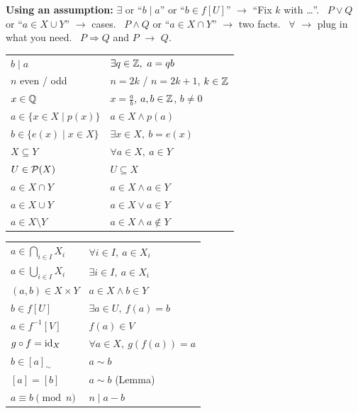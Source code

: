 \textbf{Using an assumption:} $\exists$ or ``$b\mid a$'' or ``$b\in f[U]$'' $\to$ ``Fix $k$ with \dots''. \ $P\vee Q$ or ``$a\in X\cup Y$'' $\to$ cases. \ $P\wedge Q$ or ``$a\in X\cap Y$'' $\to$ two facts. \ $\forall$ $\to$ plug in what you need. \ $P\Rightarrow Q$ and $P$ $\to$ $Q$.

\begin{center}\footnotesize\renewcommand{\arraystretch}{1.05}
\begin{tabular}[t]{@{}l l@{}}
\toprule
$b\mid a$ & $\exists q\in\mathbb{Z},\ a=qb$\\
$n$ even / odd & $n=2k$ / $n=2k+1$, $k\in\mathbb{Z}$\\
$x\in\mathbb{Q}$ & $x=\frac ab$, $a,b\in\mathbb{Z}$, $b\neq0$\\
$a\in\{x\in X\mid p(x)\}$ & $a\in X\wedge p(a)$\\
$b\in\{e(x)\mid x\in X\}$ & $\exists x\in X,\ b=e(x)$\\
$X\subseteq Y$ & $\forall a\in X,\ a\in Y$\\
$U\in\mathcal{P}(X)$ & $U\subseteq X$\\
$a\in X\cap Y$ & $a\in X\wedge a\in Y$\\
$a\in X\cup Y$ & $a\in X\vee a\in Y$\\
$a\in X\setminus Y$ & $a\in X\wedge a\notin Y$\\
\bottomrule
\end{tabular}\hspace{1.5em}
\begin{tabular}[t]{@{}l l@{}}
\toprule
$a\in\bigcap_{i\in I}X_i$ & $\forall i\in I,\ a\in X_i$\\
$a\in\bigcup_{i\in I}X_i$ & $\exists i\in I,\ a\in X_i$\\
$(a,b)\in X\times Y$ & $a\in X\wedge b\in Y$\\
$b\in f[U]$ & $\exists a\in U,\ f(a)=b$\\
$a\in f^{-1}[V]$ & $f(a)\in V$\\
$g\circ f=\mathrm{id}_X$ & $\forall a\in X,\ g(f(a))=a$\\
$b\in[a]_\sim$ & $a\sim b$\\
$[a]=[b]$ & $a\sim b$ (Lemma)\\
$a\equiv b\pmod n$ & $n\mid a-b$\\
\bottomrule
\end{tabular}
\end{center}
